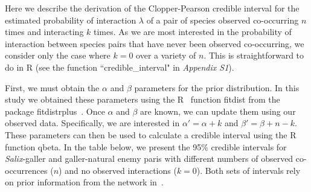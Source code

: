 \documentclass[12pt]{article}
\begin{document}
\begin{floatbox}{}
  
  Here we describe the derivation of the Clopper-Pearson credible interval for the estimated probability of interaction $\lambda$ of a pair of species observed co-occurring $n$ times and interacting $k$ times. As we are most interested in the probability of interaction between species pairs that have never been observed co-occurring, we consider only the case where $k=0$ over a variety of $n$. This is straightforward to do in R (see the function ``credible\_interval" in \emph{Appendix S1}). 


  First, we must obtain the $\alpha$ and $\beta$ parameters for the prior distribution. In this study we obtained these parameters using the R~\citep{R} function fitdist from the package fitdistrplus~\citep{fitdistrplus}. Once $\alpha$ and $\beta$ are known, we can update them using our observed data. Specifically, we are interested in $\alpha'=\alpha+k$ and $\beta'=\beta+n-k$. These parameters can then be used to calculate a credible interval using the R~\citep{R} function qbeta. In the table below, we present the 95\% credible intervals for \emph{Salix}-galler and galler-natural enemy paris with different numbers of observed co-occurrences ($n$) and no observed interactions ($k=0$). Both sets of intervals rely on prior information from the network in~\citet{Barbour2016,Barbour2016Dryad}.



\end{floatbox}
\end{document}
